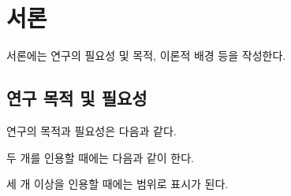 \section{서론}
서론에는 연구의 필요성 및 목적, 이론적 배경 등을 작성한다.

\subsection{연구 목적 및 필요성}
연구의 목적과 필요성은 다음과 같다\cite{Taylor1989}.

두 개를 인용할 때에는 다음과 같이 한다\cite{aksin,gillies}.

세 개 이상을 인용할 때에는 범위로 표시가 된다\cite{Taylor1989,aksin,gillies}.